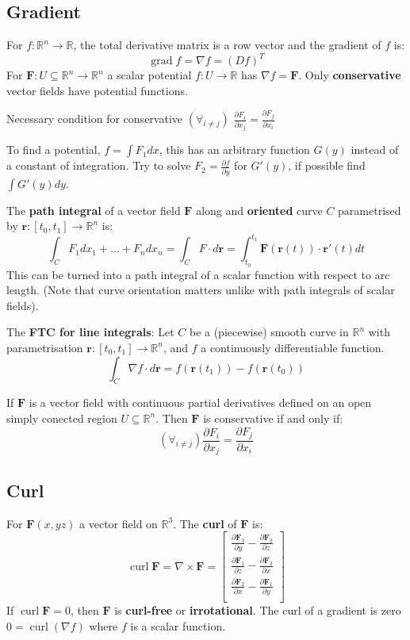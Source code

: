 \documentclass[a4paper]{article}
\newcommand{\RR}{\mathbb{R}}
\def\pp#1#2{\frac{\partial #1}{\partial #2}}
\def\curl{\operatorname{curl}}
\begin{document}
\begin{multicols}{2}
	\subsection*{Gradient}

	For $f:\RR^n\to\RR$, the total derivative matrix is a row vector and the gradient of $f$ is:
	$$\operatorname{grad} f= \nabla f= (Df)^T$$
	For $\mathbf{F}:U\subseteq\RR^n\to\RR^n$ a scalar potential  $f:U\to\RR$ has $\nabla f=\mathbf{F}$. Only \textbf{conservative} vector fields have potential functions.

	Necessary condition for conservative $(\forall_{i\neq j})$	$\pp{F_i}{x_j}=\pp{F_j}{x_i}$

	To find a potential, $f=\int F_1dx$, this has an arbitrary function $G(y)$ instead of a constant of integration. Try to solve $F_2=\pp{f}y$ for $G'(y)$, if possible find $\int G'(y)dy$.

	The \textbf{path integral} of a vector field $\mathbf{F}$ along and \textbf{oriented} curve $C$ parametrised by $\mathbf{r}:[t_0,t_1]\to\RR^n$ is:
	\[
		\int_C F_1dx_1+\dots+F_ndx_n=\int_CF\cdot d\mathbf{r}=\int_{t_0}^{t_1}\mathbf{F}(\mathbf{r}(t))\cdot \mathbf{r}'(t)dt
	\]
	This can be turned into a path integral of a scalar function with respect to arc length. (Note that curve orientation matters unlike with path integrals of scalar fields).

	The \textbf{FTC for line integrals}: Let $C$ be a (piecewise) smooth curve in $\RR^n$ with parametrisation $\mathbf{r}:[t_0,t_1]\to\RR^n$, and $f$ a continuously differentiable function.
	$$\int_C\nabla f \cdot d\mathbf{r}=f(\mathbf{r}(t_1))-f(\mathbf{r}(t_0))$$

	If $\textbf{F}$ is a vector field with continuous partial derivatives defined on an open simply conected region $U\subseteq\RR^n$. Then $\mathbf{F}$ is conservative if and only if:
	$$(\forall_{i\neq j})\pp{F_i}{x_j}=\pp{F_j}{x_i}$$


	\subsection*{Curl}
	For $\mathbf{F}(x,yz)$ a vector field on $\RR^3$. The \textbf{curl} of $\mathbf{F}$ is:
	$$
		\curl \mathbf{F}=\nabla\times \mathbf{F}=\begin{bmatrix}
			\pp{\mathbf{F}_3}{y}-\pp{\mathbf{F}_2}{z} \\
			\pp{\mathbf{F}_1}{z}-\pp{\mathbf{F}_3}{x} \\
			\pp{\mathbf{F}_2}{x}-\pp{\mathbf{F}_1}{y} \\
		\end{bmatrix}
	$$
	If $\curl\mathbf{F}=0$, then $\mathbf{F}$ is \textbf{curl-free} or \textbf{irrotational}. The curl of a gradient is zero $0=\curl(\nabla f)$ where $f$ is a scalar function.


\end{multicols}
\end{document}
